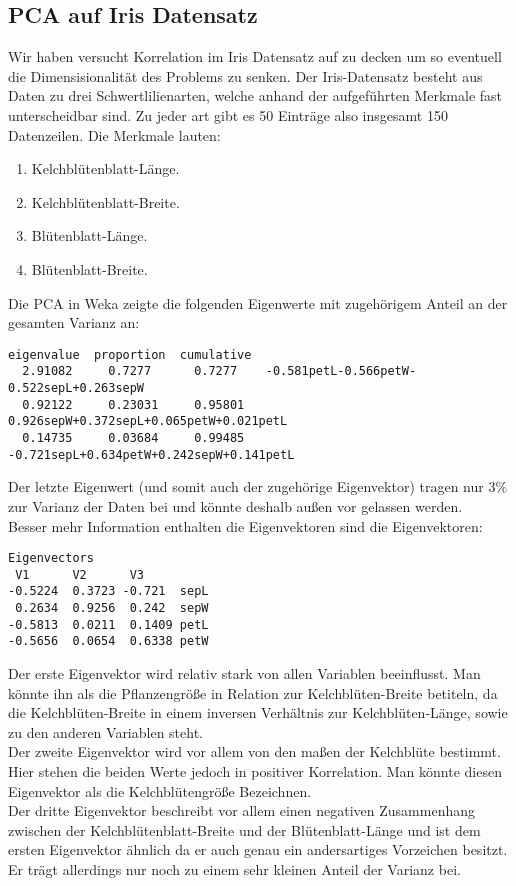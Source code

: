 \documentclass[a4paper]{article}
\begin{document}
\subsection{PCA auf Iris Datensatz}
Wir haben versucht Korrelation im Iris Datensatz auf zu decken um so eventuell die Dimensisionalität des Problems zu senken. Der Iris-Datensatz besteht aus Daten zu drei Schwertlilienarten, welche anhand der aufgeführten Merkmale fast unterscheidbar sind. Zu jeder art gibt es 50 Einträge also insgesamt 150 Datenzeilen. Die Merkmale lauten:
\begin{enumerate}
\item Kelchblütenblatt-Länge.
\item Kelchblütenblatt-Breite.
\item Blütenblatt-Länge.
\item Blütenblatt-Breite.
\end{enumerate}
Die PCA in Weka zeigte die folgenden Eigenwerte mit zugehörigem Anteil an der gesamten Varianz an:
\begin{lstlisting}
eigenvalue	proportion	cumulative
  2.91082	  0.7277 	  0.7277 	-0.581petL-0.566petW-0.522sepL+0.263sepW
  0.92122	  0.23031	  0.95801	0.926sepW+0.372sepL+0.065petW+0.021petL
  0.14735	  0.03684	  0.99485	-0.721sepL+0.634petW+0.242sepW+0.141petL
\end{lstlisting}
Der letzte Eigenwert (und somit auch der zugehörige Eigenvektor) tragen nur $ 3\% $ zur Varianz der Daten bei und könnte deshalb außen vor gelassen werden.  \\
Besser mehr Information enthalten die Eigenvektoren sind die Eigenvektoren:
\begin{lstlisting}
Eigenvectors
 V1	 	 V2	 	 V3	
-0.5224	 0.3723	-0.721 	sepL
 0.2634	 0.9256	 0.242 	sepW
-0.5813	 0.0211	 0.1409	petL
-0.5656	 0.0654	 0.6338	petW
\end{lstlisting}
Der erste Eigenvektor wird relativ stark von allen Variablen beeinflusst. Man könnte ihn als die Pflanzengröße in Relation zur Kelchblüten-Breite betiteln, da die Kelchblüten-Breite in einem inversen Verhältnis zur Kelchblüten-Länge, sowie zu den anderen Variablen steht. \\
Der zweite Eigenvektor wird vor allem von den maßen der Kelchblüte bestimmt. Hier stehen die beiden Werte jedoch in positiver Korrelation. Man könnte diesen Eigenvektor als die Kelchblütengröße Bezeichnen.\\
Der dritte Eigenvektor beschreibt vor allem einen negativen Zusammenhang zwischen der Kelchblütenblatt-Breite und der Blütenblatt-Länge und ist dem ersten Eigenvektor ähnlich da er auch genau ein andersartiges Vorzeichen besitzt. Er trägt allerdings nur noch zu einem sehr kleinen Anteil der Varianz bei.\\
\end{document}
